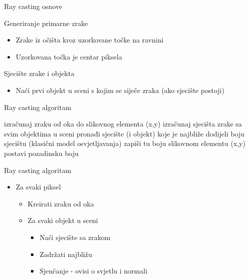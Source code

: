 \documentclass[9pt]{beamer}
\begin{document}
\begin{frame}{Ray casting osnove}
\begin{block}{Generiranje primarne zrake}
	\begin{itemize}
		\item Zrake iz očišta kroz uzorkovane točke na ravnini
		\item Uzorkovana točka je centar piksela
	\end{itemize}
\end{block}
\begin{block}{Sjecište zrake i objekta}
	\begin{itemize}
		\item Naći prvi objekt u sceni s kojim se siječe zraka (ako sjecište postoji)
	\end{itemize}
\end{block}
\end{frame}

\begin{frame}{Ray casting algoritam}
\begin{algorithm*}[H]
	{
		izračunaj zraku od oka do slikovnog elementa (x,y)\;
		izračunaj sjecišta zrake sa svim objektima u sceni\;
		pronađi sjecište (i objekt) koje je najbliže\;
		{
			dodijeli boju sjecištu (klasični model osvjetljavanja)\;
			zapiši tu boju slikovnom elementu (x,y)\;
		}\Else
		{
			postavi pozadinsku boju\;
		}
	}
\end{algorithm*}
\end{frame}

\begin{frame}{Ray casting algoritam}
\begin{itemize}
	\item Za svaki piksel
	\begin{itemize}
		\item \alert{Kreirati zraku od oka}
		\item Za svaki objekt u sceni
		\begin{itemize}
			\item Naći sjecište sa zrakom
			\item Zadržati najbližu
			\item Sjenčanje - ovisi o svjetlu i normali
		\end{itemize}
	\end{itemize}
\end{itemize}
\end{frame}
\end{document}
